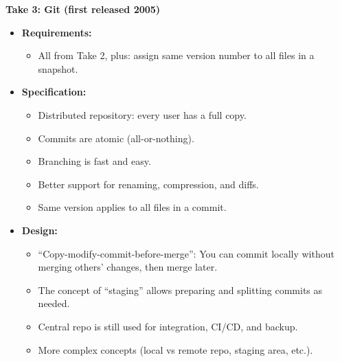 \documentclass[11pt,a4paper]{article}
\begin{document}
\textbf{Take 3: Git (first released 2005)}
\begin{itemize}
    \item \textbf{Requirements:}
        \begin{itemize}
            \item All from Take 2, plus: assign same version number to all files in a snapshot.
        \end{itemize}
    \item \textbf{Specification:}
        \begin{itemize}
            \item Distributed repository: every user has a full copy.
            \item Commits are atomic (all-or-nothing).
            \item Branching is fast and easy.
            \item Better support for renaming, compression, and diffs.
            \item Same version applies to all files in a commit.
        \end{itemize}
    \item \textbf{Design:}
        \begin{itemize}
            \item ``Copy-modify-commit-before-merge'': You can commit locally without merging others’ changes, then merge later.
            \item The concept of ``staging'' allows preparing and splitting commits as needed.
            \item Central repo is still used for integration, CI/CD, and backup.
            \item More complex concepts (local vs remote repo, staging area, etc.).
        \end{itemize}
\end{itemize}
\end{document}
